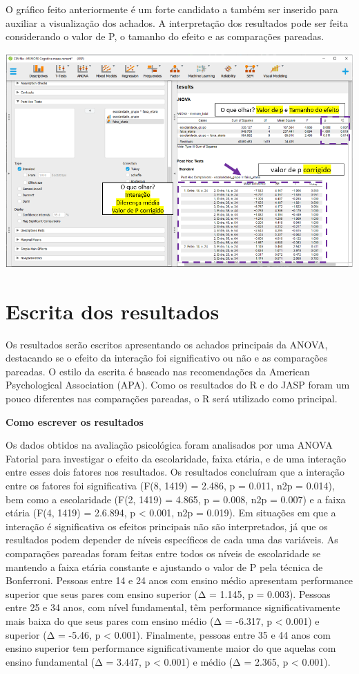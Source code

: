 \documentclass[
]{book}
\begin{document}
O gráfico feito anteriormente é um forte candidato a também ser inserido para auxiliar a visualização dos achados. A interpretação dos resultados pode ser feita considerando o valor de P, o tamanho do efeito e as comparações pareadas.

\includegraphics{./img/cap_anova_fatorial_posthoc4.png}

\hypertarget{escrita-dos-resultados-9}{%
\section{Escrita dos resultados}\label{escrita-dos-resultados-9}}

Os resultados serão escritos apresentando os achados principais da ANOVA, destacando se o efeito da interação foi significativo ou não e as comparações pareadas. O estilo da escrita é baseado nas recomendações da American Psychological Association (APA). Como os resultados do R e do JASP foram um pouco diferentes nas comparações pareadas, o R será utilizado como principal.

\textbf{Como escrever os resultados}

Os dados obtidos na avaliação psicológica foram analisados por uma ANOVA Fatorial para investigar o efeito da escolaridade, faixa etária, e de uma interação entre esses dois fatores nos resultados. Os resultados concluíram que a interação entre os fatores foi significativa (F(8, 1419) = 2.486, p = 0.011, n2p = 0.014), bem como a escolaridade (F(2, 1419) = 4.865, p = 0.008, n2p = 0.007) e a faixa etária (F(4, 1419) = 2.6.894, p \textless{} 0.001, n2p = 0.019). Em situações em que a interação é significativa os efeitos principais não são interpretados, já que os resultados podem depender de níveis específicos de cada uma das variáveis. As comparações pareadas foram feitas entre todos os níveis de escolaridade se mantendo a faixa etária constante e ajustando o valor de P pela técnica de Bonferroni. Pessoas entre 14 e 24 anos com ensino médio apresentam performance superior que seus pares com ensino superior (Δ = 1.145, p = 0.003). Pessoas entre 25 e 34 anos, com nível fundamental, têm performance significativamente mais baixa do que seus pares com ensino médio (Δ = -6.317, p \textless{} 0.001) e superior (Δ = -5.46, p \textless{} 0.001). Finalmente, pessoas entre 35 e 44 anos com ensino superior tem performance significativamente maior do que aquelas com ensino fundamental (Δ = 3.447, p \textless{} 0.001) e médio (Δ = 2.365, p \textless{} 0.001).
\end{document}
